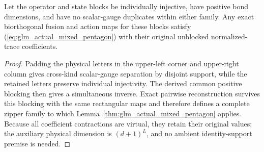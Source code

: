 \begin{lemma}
    \leanok
    \label{thm:glm_unblocked_mixed_pentagon}
    Let the operator and state blocks be individually injective, have
    positive bond dimensions, and have no scalar-gauge duplicates within
    either family. Any exact biorthogonal fusion and action maps for these
    blocks satisfy (\ref{eq:glm_actual_mixed_pentagon}) with their original
    unblocked normalized-trace coefficients.
\end{lemma}
\begin{proof}
    \leanok
    Padding the physical letters in the upper-left corner and upper-right
    column gives cross-kind scalar-gauge separation by disjoint support,
    while the retained letters preserve individual injectivity.
    The derived common positive blocking then gives a simultaneous inverse.
    Exact pairwise reconstruction survives this blocking with the same
    rectangular maps and therefore defines a complete zipper family to which
    Lemma~\ref{thm:glm_actual_mixed_pentagon} applies. Because all
    coefficient contractions are virtual, they retain their original values;
    the auxiliary physical dimension is $(d+1)^L$, and no ambient
    identity-support premise is needed.
\end{proof}

